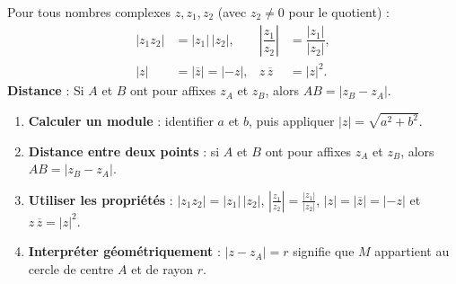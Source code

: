 \documentclass[11pt]{article}
\begin{document}
\begin{propriete}
Pour tous nombres complexes $z, z_1, z_2$ (avec $z_2 \neq 0$ pour le quotient) :
\begin{align*}
|z_1 z_2| &= |z_1|\,|z_2|, &
\left|\dfrac{z_1}{z_2}\right| &= \dfrac{|z_1|}{|z_2|}, \\
|z| &= |\overline{z}| = |-z|, &
z\,\overline{z} &= |z|^2.
\end{align*}
\textbf{Distance} : Si $A$ et $B$ ont pour affixes $z_A$ et $z_B$, alors $AB = |z_B - z_A|$.
\end{propriete}

\begin{methode}
\begin{enumerate}
\item \textbf{Calculer un module} : identifier $a$ et $b$, puis appliquer $|z| = \sqrt{a^2+b^2}$.
\item \textbf{Distance entre deux points} : si $A$ et $B$ ont pour affixes $z_A$ et $z_B$, alors $AB = |z_B - z_A|$.
\item \textbf{Utiliser les propriétés} : $|z_1 z_2| = |z_1|\,|z_2|$, $\left|\frac{z_1}{z_2}\right| = \frac{|z_1|}{|z_2|}$, $|z| = |\overline{z}| = |-z|$ et $z\,\overline{z} = |z|^2$.
\item \textbf{Interpréter géométriquement} : $|z - z_A| = r$ signifie que $M$ appartient au cercle de centre $A$ et de rayon $r$.
\end{enumerate}
\end{methode}
\end{document}
